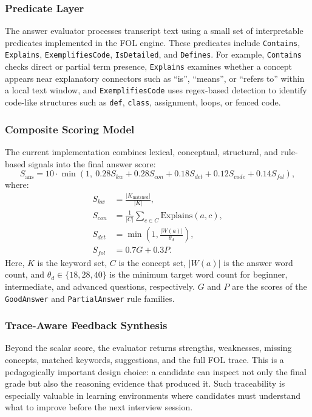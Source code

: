 \documentclass[conference]{IEEEtran}
\begin{document}
\subsubsection{Predicate Layer}
The answer evaluator processes transcript text using a small set of interpretable predicates implemented in the FOL engine. These predicates include \texttt{Contains}, \texttt{Explains}, \texttt{ExemplifiesCode}, \texttt{IsDetailed}, and \texttt{Defines}. For example, \texttt{Contains} checks direct or partial term presence, \texttt{Explains} examines whether a concept appears near explanatory connectors such as ``is'', ``means'', or ``refers to'' within a local text window, and \texttt{ExemplifiesCode} uses regex-based detection to identify code-like structures such as \texttt{def}, \texttt{class}, assignment, loops, or fenced code.

\subsubsection{Composite Scoring Model}
The current implementation combines lexical, conceptual, structural, and rule-based signals into the final answer score:
\begin{equation}
S_{\mathrm{ans}} = 10 \cdot \min \left(1,\ 0.28S_{kw} + 0.28S_{con} + 0.18S_{det} + 0.12S_{code} + 0.14S_{fol}\right),
\label{eq:score}
\end{equation}
where:
\begin{align}
S_{kw} &= \frac{|K_{\mathrm{matched}}|}{|K|}, \\
S_{con} &= \frac{1}{|C|}\sum_{c \in C}\mathrm{Explains}(a,c), \\
S_{det} &= \min\left(1,\frac{|W(a)|}{\theta_d}\right), \\
S_{fol} &= 0.7G + 0.3P.
\end{align}
Here, $K$ is the keyword set, $C$ is the concept set, $|W(a)|$ is the answer word count, and $\theta_d \in \{18, 28, 40\}$ is the minimum target word count for beginner, intermediate, and advanced questions, respectively. $G$ and $P$ are the scores of the \texttt{GoodAnswer} and \texttt{PartialAnswer} rule families.

\subsubsection{Trace-Aware Feedback Synthesis}
Beyond the scalar score, the evaluator returns strengths, weaknesses, missing concepts, matched keywords, suggestions, and the full FOL trace. This is a pedagogically important design choice: a candidate can inspect not only the final grade but also the reasoning evidence that produced it. Such traceability is especially valuable in learning environments where candidates must understand what to improve before the next interview session.
\end{document}
